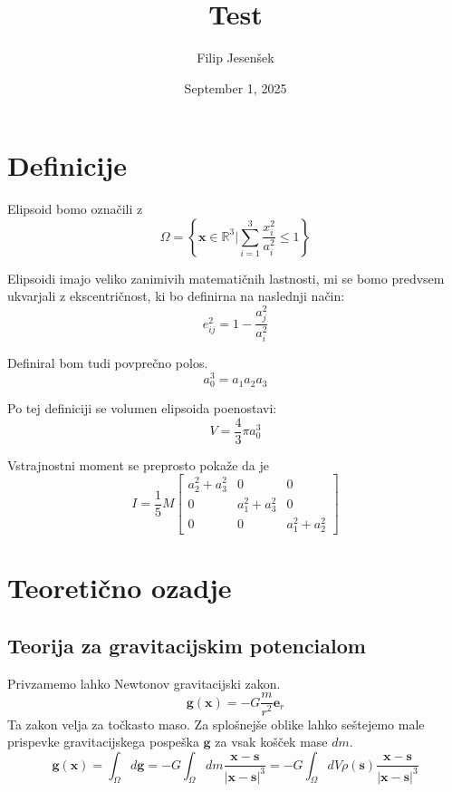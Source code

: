\documentclass{article}
\author{Filip Jesenšek}
\date{September 1, 2025}
\theoremstyle{definition}
\theoremstyle{plain}
\numberwithin{definition}{section}
\numberwithin{theorem}{section} \title{Test}
\begin{document}
\maketitle

\newpage

\tableofcontents

\newpage


\begin{abstract}
\end{abstract}

\section{Definicije}
Elipsoid bomo označili z 
\begin{equation}
	\Omega = \left\{ \boldsymbol{x} \in \mathbb{R}^3 | 
	\sum_{i=1}^{3} \frac{x_i^2}{a_i^2} \leq 1 \right\}
	\label{eq: elipsoid}
\end{equation}

Elipsoidi imajo veliko zanimivih matematičnih lastnosti, mi se bomo predvsem
ukvarjali z ekscentričnost, ki bo definirna na naslednji način:
\begin{equation}
	e_{ij}^2 = 1 - \frac{a_j^2}{a_i^2}
	\label{eq:ekscentricnost}
\end{equation}

Definiral bom tudi povprečno polos.
\begin{equation}
	a_0^3 = a_1 a_2 a_3
	\label{eq:avg_polos}
\end{equation}

Po tej definiciji se volumen elipsoida poenostavi:
\begin{equation}
	V = \frac{4}{3} \pi a_0^3
	\label{eq:volumen_avg}
\end{equation}

Vstrajnostni moment se preprosto pokaže da je
\begin{equation}
	I = \frac{1}{5} M
	\begin{bmatrix}
		a_2^2 + a_3^2 & 0 & 0 \\
		0 & a_1^2 + a_3^2 & 0 \\
		0 & 0 & a_1^2 + a_2^2
	\end{bmatrix}
	\label{eq:vstrajnostni}
\end{equation}

\section{Teoretično ozadje}
\subsection{Teorija za gravitacijskim potencialom}
Privzamemo lahko Newtonov gravitacijski zakon.
$$\boldsymbol{g}(\boldsymbol{x}) = -G \frac{m}{r^{2}} \boldsymbol{e}_{r}$$
Ta zakon velja za točkasto maso. 
Za splošnejše oblike lahko seštejemo male prispevke
gravitacijskega pospeška $\boldsymbol{g}$ za vsak košček mase $dm$. 
$$\boldsymbol{g}(\boldsymbol{x}) = \int_{\Omega} d\boldsymbol{g} = 
-G \int_{\Omega} dm \frac{\boldsymbol{x} - \boldsymbol{s}}{|\boldsymbol{x} - \boldsymbol{s}|^{3}} = 
-G \int_{\Omega} dV \rho(\boldsymbol{s}) \frac{\boldsymbol{x} - \boldsymbol{s}}{|\boldsymbol{x} - \boldsymbol{s}|^{3}}$$
\end{document}
